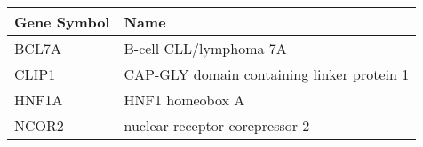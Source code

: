 \begin{tabular}{ll}
\toprule
Gene Symbol &                                       Name \\
\midrule
      BCL7A &                     B-cell CLL/lymphoma 7A \\
      CLIP1 & CAP-GLY domain containing linker protein 1 \\
      HNF1A &                            HNF1 homeobox A \\
      NCOR2 &             nuclear receptor corepressor 2 \\
\bottomrule
\end{tabular}

